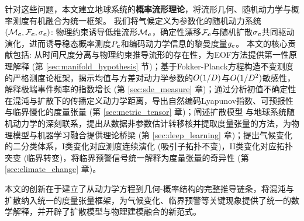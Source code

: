 针对这些问题，本文建立地球系统的\textbf{概率流形理论}，将流形几何、随机动力学与概率测度有机融合为统一框架。
我们将气候定义为参数化的随机动力系统$(\mathcal{M}_{\bm{c}}, \mathcal{F}_{\bm{c}}, \sigma_{\bm{c}})$: 物理约束诱导低维流形$\mathcal{M}_{\bm{c}}$，确定性漂移$\mathcal{F}_{\bm{c}}$与随机扩散$\sigma_{\bm{c}}$共同驱动演化，进而诱导稳态概率测度$P_{\bm{c}}$和编码动力学信息的黎曼度量$g_{\bm{c}}$。
本文的核心贡献包括: 从时间尺度分离与物理约束推导流形的存在性，为EOF方法提供第一性原理解释 (第 \ref{sec:manifold_hypothesis} 节)；基于Fokker-Planck方程构造不变测度的严格测度论框架，揭示均值与方差对动力学参数的$O(1/D)$与$O(1/D^2)$敏感性，解释极端事件频率的指数增长 (第 \ref{sec:sde_measure} 章)；通过分析初值不确定性在混沌与扩散下的传播定义动力学距离，导出自然编码Lyapunov指数、可预报性与临界慢化的度量张量 (第 \ref{sec:metric_tensor} 章)；阐述扩散模型 \cite{ho2020denoising,song2021scorebased}与地球系统随机动力学的深刻联系，提出从数据非参数估计转移核并提取度量张量的方法，为物理模型与机器学习融合提供理论桥梁 (第 \ref{sec:deep_learning} 章)；提出气候变化的二分类体系，I类变化对应测度连续演化 (吸引子拓扑不变)，II类变化对应拓扑突变 (临界转变)，将临界预警信号统一解释为度量张量的奇异性 (第 \ref{sec:climate_change} 章)。

本文的创新在于建立了从动力学方程到几何-概率结构的完整推导链条，将混沌与扩散纳入统一的度量张量框架，为气候变化、临界预警等关键现象提供了统一的数学解释，并开辟了扩散模型与物理建模融合的新范式。
